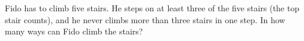 Fido has to climb five stairs. He steps on at least three of the five stairs (the top stair counts), and he never climbs more than three stairs in one step. In how many ways can Fido climb the stairs?
